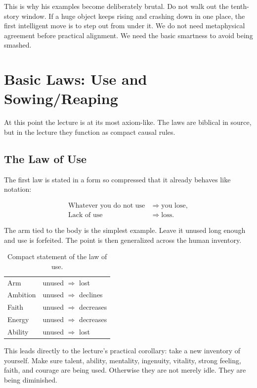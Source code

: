 This is why his examples become deliberately brutal. Do not walk out the tenth-story window. If a huge object keeps rising and crashing down in one place, the first intelligent move is to step out from under it. We do not need metaphysical agreement before practical alignment. We need the basic smartness to avoid being smashed.

\section{Basic Laws: Use and Sowing/Reaping}

At this point the lecture is at its most axiom-like. The laws are biblical in source, but in the lecture they function as compact causal rules.

\subsection{The Law of Use}

The first law is stated in a form so compressed that it already behaves like notation:

\begin{align}
\text{Whatever you do not use} &\Longrightarrow \text{you lose},\\
\text{Lack of use} &\Longrightarrow \text{loss}.
\end{align}

The arm tied to the body is the simplest example. Leave it unused long enough and use is forfeited. The point is then generalized across the human inventory.

\begin{table}[h]
\centering
\begin{tabular}{ll}
Arm & unused \(\Longrightarrow\) lost \\
Ambition & unused \(\Longrightarrow\) declines \\
Faith & unused \(\Longrightarrow\) decreases \\
Energy & unused \(\Longrightarrow\) decreases \\
Ability & unused \(\Longrightarrow\) lost
\end{tabular}
\caption{Compact statement of the law of use.}
\end{table}

This leads directly to the lecture's practical corollary: take a new inventory of yourself. Make sure talent, ability, mentality, ingenuity, vitality, strong feeling, faith, and courage are being used. Otherwise they are not merely idle. They are being diminished.

